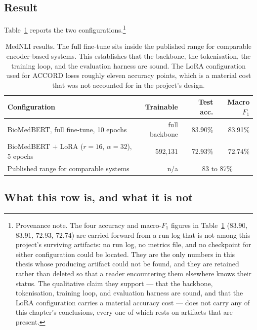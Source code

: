 \subsection{Result}

Table~\ref{tab:mednli} reports the two configurations.\footnote{Provenance
note. The four accuracy and macro-$F_1$ figures in Table~\ref{tab:mednli}
($83.90$, $83.91$, $72.93$, $72.74$) are carried forward from a run log that is
not among this project's surviving artifacts: no run log, no metrics file, and
no checkpoint for either configuration could be located. They are the only
numbers in this thesis whose producing artifact could not be found, and they are
retained rather than deleted so that a reader encountering them elsewhere knows
their status. The qualitative claim they support --- that the backbone,
tokenisation, training loop, and evaluation harness are sound, and that the LoRA
configuration carries a material accuracy cost --- does not carry any of this
chapter's conclusions, every one of which rests on artifacts that are present.}

\begin{table}[t]
\centering
\small
\begin{tabular}{lrrr}
\toprule
\textbf{Configuration} & \textbf{Trainable} & \textbf{Test acc.} & \textbf{Macro $F_1$} \\
\midrule
BioMedBERT, full fine-tune, 10 epochs        & full backbone & 83.90\% & 83.91\% \\
BioMedBERT $+$ LoRA ($r{=}16$, $\alpha{=}32$), 5 epochs & 592,131 & 72.93\% & 72.74\% \\
\midrule
Published range for comparable systems       & n/a & \multicolumn{2}{c}{83 to 87\%} \\
\bottomrule
\end{tabular}
\caption{MedNLI results. The full fine-tune sits inside the published range for
comparable encoder-based systems. This establishes that the backbone, the
tokenisation, the training loop, and the evaluation harness are sound. The LoRA
configuration used for ACCORD loses roughly eleven accuracy points, which is a
material cost that was not accounted for in the project's design.}
\label{tab:mednli}
\end{table}

\subsection{What this row is, and what it is not}

